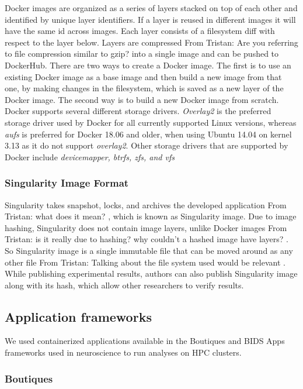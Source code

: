 \documentclass[a4paper,num-refs]{oup-contemporary}
\newcommand{\TG}[1]{\color{blue}From Tristan: #1 \color{black}}
\begin{document}
Docker images are organized as a series of layers stacked on top of each
other and identified by unique layer identifiers. If a layer is reused
in different images it will
have the same id across images. Each layer consists of a filesystem diff
with respect to the layer below. Layers are compressed \TG{Are you
referring to file compression similar to gzip?} into a single image and can
be pushed to DockerHub. There are two ways to create a Docker image. The
first is to use an existing Docker image as a base image and then build a
new image from that one, by making changes in the filesystem, which is
saved as a new layer of the Docker image. The second way is to build a new
Docker image from scratch. Docker supports several different storage drivers.
\textit{Overlay2} is the preferred storage driver used by Docker for all currently
supported Linux versions, whereas \textit{aufs} is preferred for Docker 18.06 and
older, when using Ubuntu 14.04 on kernel 3.13 as it do not support \textit{overlay2}.
Other storage drivers that are supported by Docker include \textit{devicemapper, btrfs,
zfs, and vfs}

\subsubsection{Singularity Image Format}

Singularity takes snapshot, locks, and archives the developed application
\TG{what does it mean?}, which is known as Singularity image. Due to image
hashing, Singularity does not contain image layers, unlike Docker images
\TG{is it really due to hashing? why couldn't a hashed image have layers?}.
So Singularity image is a single immutable file that can be moved around as
any other file \TG{Talking about the file system used would be relevant}.
While publishing experimental results, authors can also publish Singularity
image along with its hash, which allow other researchers to verify results.

\subsection{Application frameworks}

We used containerized applications available in the Boutiques and BIDS Apps
frameworks used in neuroscience to run analyses on HPC clusters. 

\subsubsection{Boutiques}
\end{document}
